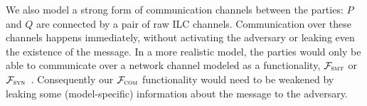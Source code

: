 %

We also model a strong form of communication channels between the parties: $P$
and $Q$ are connected by a pair of raw ILC channels. Communication over these
channels happens immediately, without activating the adversary or leaking even
the existence of the message.  In a more realistic model, the parties would only
be able to communicate over a network channel modeled as a functionality,
$\mathcal{F}_{\textnormal{\ensuremath{{\mathsf {{\textsc{smt}}}}}}}$ or $\mathcal{F}_{\textnormal{\ensuremath{{\mathsf {{\textsc{syn}}}}}}}$~\cite{canetti2001universally}.
Consequently our $\mathcal{F}_{\textnormal{\ensuremath{{\mathsf {{\textsc{com}}}}}}}$ functionality would need to be weakened by
leaking some (model-specific) information about the message to the adversary.

%


